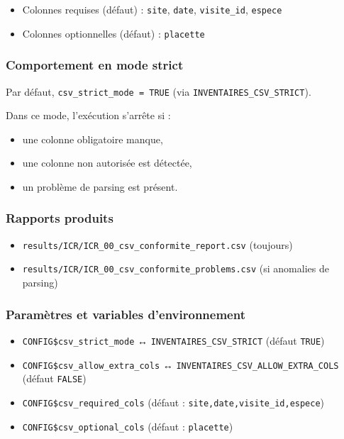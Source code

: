 \begin{itemize}
\tightlist
\item
  Colonnes requises (défaut) : \texttt{site}, \texttt{date},
  \texttt{visite\_id}, \texttt{espece}
\item
  Colonnes optionnelles (défaut) : \texttt{placette}
\end{itemize}

\subsubsection{Comportement en mode
strict}\label{comportement-en-mode-strict}

Par défaut, \texttt{csv\_strict\_mode\ =\ TRUE} (via
\texttt{INVENTAIRES\_CSV\_STRICT}).

Dans ce mode, l'exécution s'arrête si :

\begin{itemize}
\tightlist
\item
  une colonne obligatoire manque,
\item
  une colonne non autorisée est détectée,
\item
  un problème de parsing est présent.
\end{itemize}

\subsubsection{Rapports produits}\label{rapports-produits}

\begin{itemize}
\tightlist
\item
  \texttt{results/ICR/ICR\_00\_csv\_conformite\_report.csv} (toujours)
\item
  \texttt{results/ICR/ICR\_00\_csv\_conformite\_problems.csv} (si
  anomalies de parsing)
\end{itemize}

\subsubsection{Paramètres et variables
d'environnement}\label{paramuxe8tres-et-variables-denvironnement}

\begin{itemize}
\tightlist
\item
  \texttt{CONFIG\$csv\_strict\_mode} ↔ \texttt{INVENTAIRES\_CSV\_STRICT}
  (défaut \texttt{TRUE})
\item
  \texttt{CONFIG\$csv\_allow\_extra\_cols} ↔
  \texttt{INVENTAIRES\_CSV\_ALLOW\_EXTRA\_COLS} (défaut \texttt{FALSE})
\item
  \texttt{CONFIG\$csv\_required\_cols} (défaut :
  \texttt{site,date,visite\_id,espece})
\item
  \texttt{CONFIG\$csv\_optional\_cols} (défaut : \texttt{placette})
\end{itemize}

